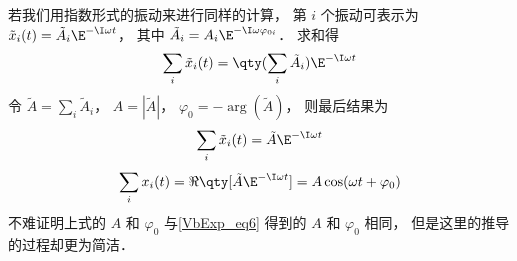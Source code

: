 若我们用指数形式的振动来进行同样的计算， 第 $i$ 个振动可表示为 $\tilde x_i(t) = \tilde A_i \E^{-\I\omega t}$， 其中 $\tilde A_i = A_i\E^{-\I\omega\varphi_{0i}}$． 求和得
\begin{equation}
\sum_i \tilde x_i(t) = \qty(\sum_i \tilde A_i ) \E^{-\I\omega t}
\end{equation}
令 $\tilde A = \sum_i \tilde A_i$， $A = |\tilde A|$， $\varphi_0 = -\arg(\tilde A)$， 则最后结果为
\begin{equation}
\sum_i \tilde x_i(t) = \tilde A \E^{-\I\omega t}
\end{equation}
\begin{equation}
\sum_i x_i(t) = \Re \qty[\tilde A \E^{-\I\omega t}] = A \cos(\omega t + \varphi_0)
\end{equation}
不难证明上式的 $A$ 和 $\varphi_0$ 与\autoref{VbExp_eq6} 得到的 $A$ 和 $\varphi_0$ 相同， 但是这里的推导的过程却更为简洁．
